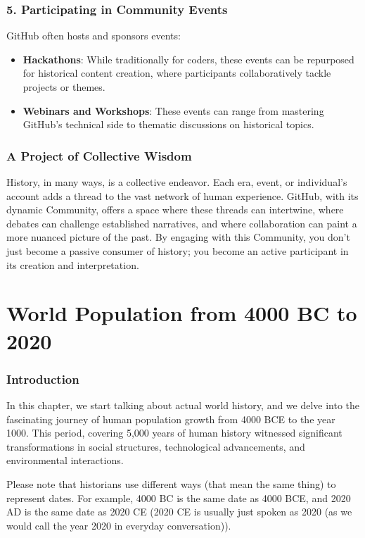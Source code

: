 \documentclass[a4paper,12pt]{book}
\begin{document}
\subsection*{5. Participating in Community Events}
GitHub often hosts and sponsors events:

\begin{itemize}
    \item \textbf{Hackathons}: While traditionally for coders, these events can be repurposed for historical content creation, where participants collaboratively tackle projects or themes.
    \item \textbf{Webinars and Workshops}: These events can range from mastering GitHub's technical side to thematic discussions on historical topics.
\end{itemize}

\subsection*{A Project of Collective Wisdom}
History, in many ways, is a collective endeavor. Each era, event, or individual's account adds a thread to the vast network of human experience. GitHub, with its dynamic Community, offers a space where these threads can intertwine, where debates can challenge established narratives, and where collaboration can paint a more nuanced picture of the past. By engaging with this Community, you don't just become a passive consumer of history; you become an active participant in its creation and interpretation.

\chapter{World Population from 4000 BC to 2020}
\subsection*{Introduction}
In this chapter, we start talking about actual world history, and we delve into the fascinating journey of human population growth from 4000 BCE to the year 1000. This period, covering 5,000 years of human history witnessed significant transformations in social structures, technological advancements, and environmental interactions. 

Please note that historians use different ways (that mean the same thing) to represent dates. For example, 4000 BC is the same date as 4000 BCE, and 2020 AD is the same date as 2020 CE (2020 CE is usually just spoken as 2020 (as we would call the year 2020 in everyday conversation)).
\end{document}
